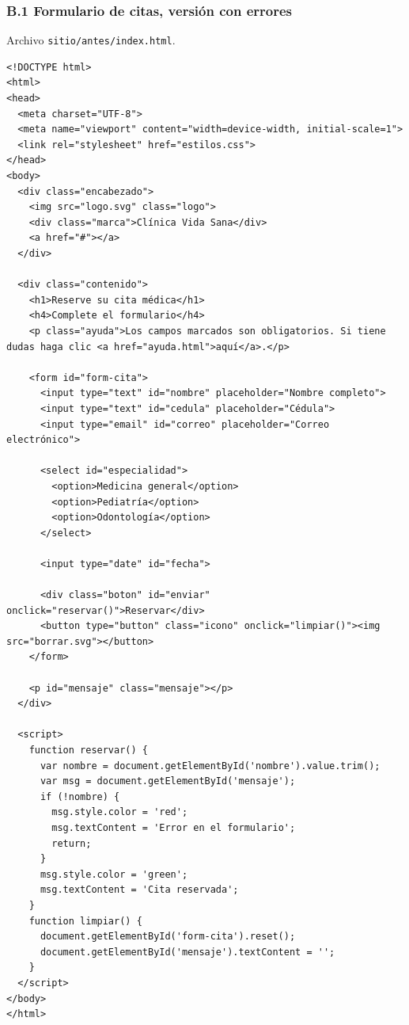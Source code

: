 \documentclass[10pt,letterpaper,onecolumn]{IEEEtran}
\begin{document}
\subsubsection{B.1 Formulario de citas, versión con errores}\label{b.1-formulario-de-citas-versiuxf3n-con-errores}

Archivo \texttt{sitio/\allowbreak{}\allowbreak{}antes/\allowbreak{}\allowbreak{}index.\allowbreak{}\allowbreak{}html}.

\begin{lstlisting}
<!DOCTYPE html>
<html>
<head>
  <meta charset="UTF-8">
  <meta name="viewport" content="width=device-width, initial-scale=1">
  <link rel="stylesheet" href="estilos.css">
</head>
<body>
  <div class="encabezado">
    <img src="logo.svg" class="logo">
    <div class="marca">Clínica Vida Sana</div>
    <a href="#"></a>
  </div>

  <div class="contenido">
    <h1>Reserve su cita médica</h1>
    <h4>Complete el formulario</h4>
    <p class="ayuda">Los campos marcados son obligatorios. Si tiene dudas haga clic <a href="ayuda.html">aquí</a>.</p>

    <form id="form-cita">
      <input type="text" id="nombre" placeholder="Nombre completo">
      <input type="text" id="cedula" placeholder="Cédula">
      <input type="email" id="correo" placeholder="Correo electrónico">

      <select id="especialidad">
        <option>Medicina general</option>
        <option>Pediatría</option>
        <option>Odontología</option>
      </select>

      <input type="date" id="fecha">

      <div class="boton" id="enviar" onclick="reservar()">Reservar</div>
      <button type="button" class="icono" onclick="limpiar()"><img src="borrar.svg"></button>
    </form>

    <p id="mensaje" class="mensaje"></p>
  </div>

  <script>
    function reservar() {
      var nombre = document.getElementById('nombre').value.trim();
      var msg = document.getElementById('mensaje');
      if (!nombre) {
        msg.style.color = 'red';
        msg.textContent = 'Error en el formulario';
        return;
      }
      msg.style.color = 'green';
      msg.textContent = 'Cita reservada';
    }
    function limpiar() {
      document.getElementById('form-cita').reset();
      document.getElementById('mensaje').textContent = '';
    }
  </script>
</body>
</html>
\end{lstlisting}
\end{document}
